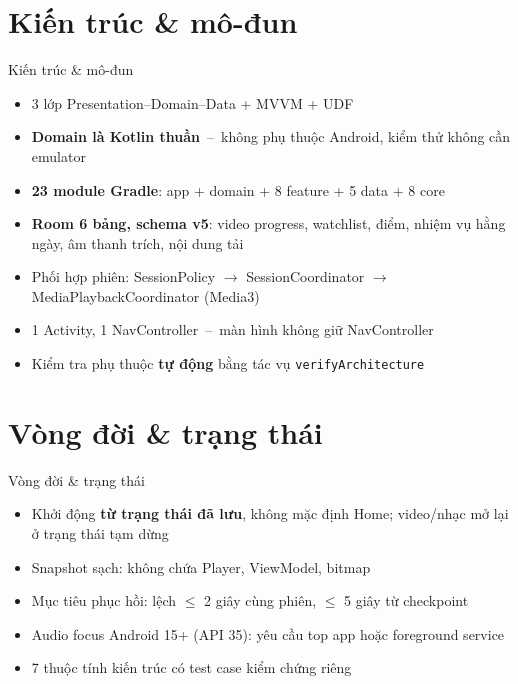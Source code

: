 \documentclass[aspectratio=169]{beamer}
\begin{document}
\section{Kiến trúc \& mô-đun}
\begin{frame}{Kiến trúc \& mô-đun}
  \begin{itemize}
    \item 3 lớp Presentation--Domain--Data + MVVM + UDF
    \item \textbf{Domain là Kotlin thuần}~--~không phụ thuộc Android, kiểm thử không cần emulator
    \item \textbf{23 module Gradle}: app + domain + 8 feature + 5 data + 8 core
    \item \textbf{Room 6 bảng, schema v5}: video progress, watchlist, điểm, nhiệm vụ hằng ngày, âm thanh trích, nội dung tải
    \item Phối hợp phiên: SessionPolicy $\rightarrow$ SessionCoordinator $\rightarrow$ MediaPlaybackCoordinator (Media3)
    \item 1 Activity, 1 NavController~--~màn hình không giữ NavController
    \item Kiểm tra phụ thuộc \textbf{tự động} bằng tác vụ \texttt{verifyArchitecture}
  \end{itemize}
\end{frame}

\section{Vòng đời \& trạng thái}
\begin{frame}{Vòng đời \& trạng thái}
  \begin{itemize}
    \item Khởi động \textbf{từ trạng thái đã lưu}, không mặc định Home; video/nhạc mở lại ở trạng thái tạm dừng
    \item Snapshot sạch: không chứa Player, ViewModel, bitmap
    \item Mục tiêu phục hồi: lệch $\leq$ 2 giây cùng phiên, $\leq$ 5 giây từ checkpoint
    \item Audio focus Android 15+ (API 35): yêu cầu top app hoặc foreground service
    \item 7 thuộc tính kiến trúc có test case kiểm chứng riêng
  \end{itemize}
\end{frame}
\end{document}

